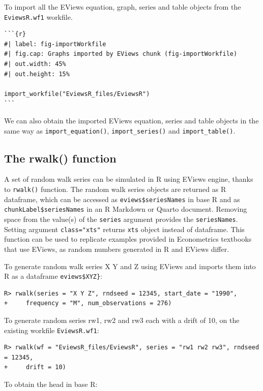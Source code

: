 To import all the EViews equation, graph, series and table objects from the \texttt{EviewsR.wf1} workfile.

\begin{verbatim}
```{r} 
#| label: fig-importWorkfile
#| fig.cap: Graphs imported by EViews chunk (fig-importWorkfile)
#| out.width: 45%
#| out.height: 15%

import_workfile("EviewsR_files/EviewsR")
```
\end{verbatim}

We can also obtain the imported EViews equation, series and table objects in the same way as \texttt{import\_equation()}, \texttt{import\_series()} and \texttt{import\_table()}.

\hypertarget{the-rwalk-function}{%
\subsection{The rwalk() function}\label{the-rwalk-function}}

A set of random walk series can be simulated in R using EViews engine, thanks to \texttt{rwalk()} function. The random walk series objects are returned as R dataframe, which can be accessed as \texttt{eviews\$seriesNames} in base R and as \texttt{chunkLabel\$seriesNames} in an R Markdown or Quarto document. Removing space from the value(s) of the \texttt{series} argument provides the \texttt{seriesNames}. Setting argument \texttt{class="xts"} returns \texttt{xts} object instead of dataframe. This function can be used to replicate examples provided in Econometrics textbooks that use EViews, as random numbers generated in R and EViews differ.

To generate random walk series X Y and Z using EViews and imports them into R as a dataframe \texttt{eviews\$XYZ\}}:

\begin{verbatim}
R> rwalk(series = "X Y Z", rndseed = 12345, start_date = "1990",
+     frequency = "M", num_observations = 276)
\end{verbatim}

To generate random series rw1, rw2 and rw3 each with a drift of 10, on the existing workfile \texttt{EviewsR.wf1}:

\begin{verbatim}
R> rwalk(wf = "EviewsR_files/EviewsR", series = "rw1 rw2 rw3", rndseed = 12345,
+     drift = 10)
\end{verbatim}

To obtain the head in base R:

